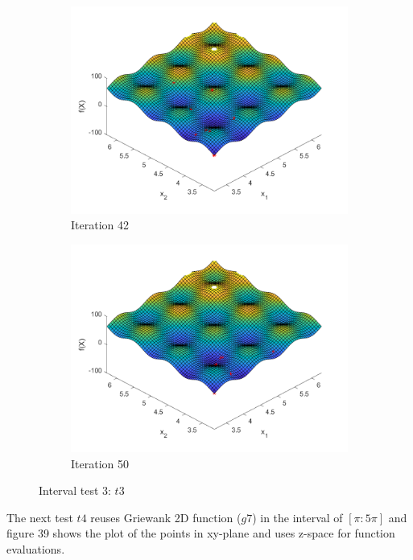 \begin{figure}
\begin{subfigure}[b]{0.4\textwidth}
   \includegraphics[width=\textwidth]{img/smpl/rast2dshft/loa-iter-42}
   \caption{Iteration 42}
   \label{fig:i3-iter-6}
 \end{subfigure}
 \begin{subfigure}[b]{0.4\textwidth}
   \includegraphics[width=\textwidth]{img/smpl/rast2dshft/loa-iter-50}
   \caption{Iteration 50}
   \label{fig:i3-iter-7}
 \end{subfigure}
 \caption{Interval test 3: $t3$}
\end{figure}

\par The next test $t4$ reuses Griewank 2D function ($g7$) in the interval of $[\pi:5\pi]$ and figure 39 shows the plot of the points in xy-plane and uses z-space for function evaluations.

